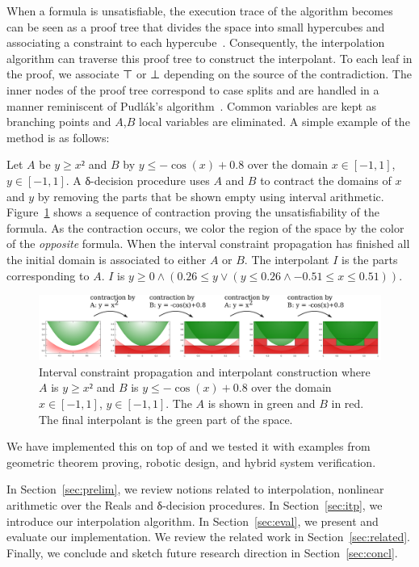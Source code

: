 When a formula is unsatisfiable, the execution trace of the algorithm becomes can be seen as a proof tree that divides the space into small hypercubes and associating a constraint to each hypercube~\cite{DBLP:conf/synasc/GaoKC14}. Consequently, the interpolation algorithm can traverse this proof tree to construct the interpolant. To each leaf in the proof, we associate ⊤ or ⊥ depending on the source of the contradiction. The inner nodes of the proof tree correspond to case splits and are handled in a manner reminiscent of Pudl{\'a}k's algorithm~\cite{MR1472134}. Common variables are kept as branching points and $A$,$B$ local variables are eliminated. A simple example of the method is as follows:
\begin{example}
Let $A$ be $y≥x²$ and $B$ by $y ≤ -\cos(x) + 0.8$ over the domain $x∈[-1,1]$, $y∈[-1,1]$.
A δ-decision procedure uses $A$ and $B$ to contract the domains of $x$ and $y$ by removing the parts that be shown empty using interval arithmetic.
Figure~\ref{fig:example} shows a sequence of contraction proving the unsatisfiability of the formula.
As the contraction occurs, we color the region of the space by the color of the \emph{opposite} formula.
When the interval constraint propagation has finished all the initial domain is associated to either $A$ or $B$.
The interpolant $I$ is the parts corresponding to $A$.
$I$ is $y ≥ 0 ∧ (0.26 ≤ y ∨ (y ≤ 0.26 ∧ -0.51 ≤ x ≤ 0.51))$.

\begin{figure}
\centering
\includegraphics[scale=0.04]{img/example.pdf}
\caption{
    Interval constraint propagation and interpolant construction where $A$ is $y≥x²$ and $B$ is $y ≤ -\cos(x) + 0.8$ over the domain $x∈[-1,1]$, $y∈[-1,1]$.
    The $A$ is shown in green and $B$ in red.
    The final interpolant is the green part of the space.
}
\label{fig:example}
\end{figure}
\end{example}

We have implemented this on top of \dReal and we tested it with examples from geometric theorem proving, robotic design, and hybrid system verification.  

In Section~\ref{sec:prelim}, we review notions related to interpolation, nonlinear arithmetic over the Reals and δ-decision procedures.
In Section~\ref{sec:itp}, we introduce our interpolation algorithm.
In Section~\ref{sec:eval}, we present and evaluate our implementation.
We review the related work in Section~\ref{sec:related}.
Finally, we conclude and sketch future research direction in Section~\ref{sec:concl}.

